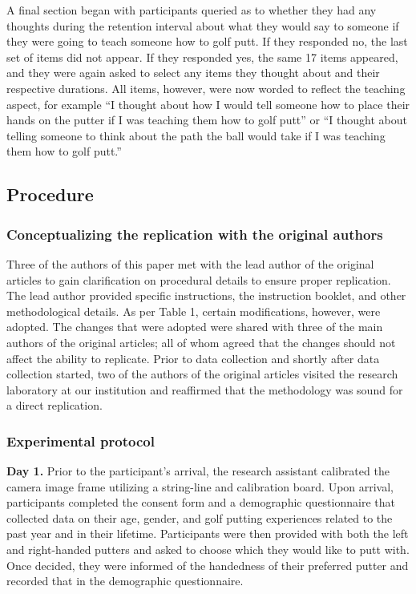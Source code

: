 \documentclass[
  english,
  man,floatsintext]{apa7}
\begin{document}
A final section began with participants queried as to whether they had any thoughts during the retention interval about what they would say to someone if they were going to teach someone how to golf putt. If they responded no, the last set of items did not appear. If they responded yes, the same 17 items appeared, and they were again asked to select any items they thought about and their respective durations. All items, however, were now worded to reflect the teaching aspect, for example ``I thought about how I would tell someone how to place their hands on the putter if I was teaching them how to golf putt'' or ``I thought about telling someone to think about the path the ball would take if I was teaching them how to golf putt.''

\hypertarget{procedure}{%
\subsection{Procedure}\label{procedure}}

\hypertarget{conceptualizing-the-replication-with-the-original-authors}{%
\subsubsection{Conceptualizing the replication with the original authors}\label{conceptualizing-the-replication-with-the-original-authors}}

Three of the authors of this paper met with the lead author of the original articles to gain clarification on procedural details to ensure proper replication. The lead author provided specific instructions, the instruction booklet, and other methodological details. As per Table 1, certain modifications, however, were adopted. The changes that were adopted were shared with three of the main authors of the original articles; all of whom agreed that the changes should not affect the ability to replicate. Prior to data collection and shortly after data collection started, two of the authors of the original articles visited the research laboratory at our institution and reaffirmed that the methodology was sound for a direct replication.

\hypertarget{experimental-protocol}{%
\subsubsection{Experimental protocol}\label{experimental-protocol}}

\textbf{Day 1.} Prior to the participant's arrival, the research assistant calibrated the camera image frame utilizing a string-line and calibration board. Upon arrival, participants completed the consent form and a demographic questionnaire that collected data on their age, gender, and golf putting experiences related to the past year and in their lifetime. Participants were then provided with both the left and right-handed putters and asked to choose which they would like to putt with. Once decided, they were informed of the handedness of their preferred putter and recorded that in the demographic questionnaire.
\end{document}
